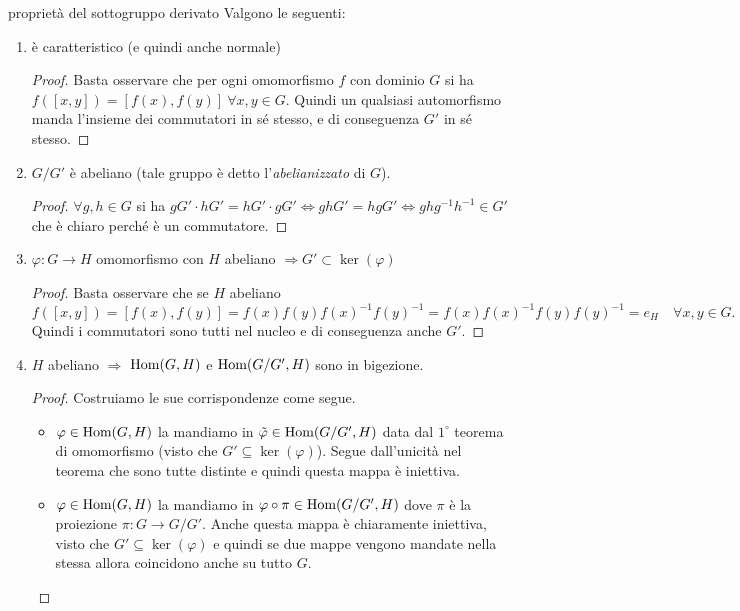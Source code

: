 \begin{proposition}{proprietà del sottogruppo derivato}
    Valgono le seguenti:
    \begin{enumerate}
        \item è caratteristico (e quindi anche normale)
        \begin{proof}
            Basta osservare che per ogni omomorfismo $f$ con dominio $G$ si ha $f([x,y]) = [f(x),f(y)] \ \forall x,y \in G$. Quindi un qualsiasi automorfismo manda l'insieme dei commutatori in sé stesso, e di conseguenza $G'$ in sé stesso.
        \end{proof}
        
        \item $G/G'$ è abeliano (tale gruppo è detto l'\textit{abelianizzato} di $G$).
        \begin{proof}
            $\forall g,h \in G$ si ha $gG' \cdot hG' =  hG' \cdot gG' \iff gh G' = hgG' \iff ghg^{-1}h^{-1} \in G'$ che è chiaro perché è un commutatore.
        \end{proof}
        
        \item $\varphi: G \rightarrow H$ omomorfismo con $H$ abeliano $\Rightarrow G' \subset \ker(\varphi)$
        \begin{proof}
            Basta osservare che se $H$ abeliano
            \[
                f([x,y]) = [f(x),f(y)] = f(x)f(y)f(x)^{-1}f(y)^{-1} = f(x)f(x)^{-1}f(y)f(y)^{-1} = e_H \quad \forall x,y \in G.
            \]
            Quindi i commutatori sono tutti nel nucleo e di conseguenza anche $G'$.
        \end{proof}
        
        \item $H$ abeliano $\Rightarrow$ $\text{Hom}(G,H)$ e $\text{Hom}(G/G',H)$ sono in bigezione.
        \begin{proof}
            Costruiamo le sue corrispondenze come segue. 
            \begin{itemize}
            \item $\varphi \in \text{Hom}(G,H)$ la mandiamo in $\tilde \varphi \in \text{Hom}(G/G',H)$ data dal $1^{\circ}$ teorema di omomorfismo (visto che $G' \subseteq \ker(\varphi)$). Segue dall'unicità nel teorema che sono tutte distinte e quindi questa mappa è iniettiva.
            \item $\varphi \in \text{Hom}(G,H)$ la mandiamo in $\varphi \circ \pi \in \text{Hom}(G/G',H)$ dove $\pi$ è la proiezione $\pi: G \rightarrow G/G'$. Anche questa mappa è chiaramente iniettiva, visto che $G' \subseteq \ker(\varphi)$ e quindi se due mappe vengono mandate nella stessa allora coincidono anche su tutto $G$.
            \end{itemize}
        \end{proof}
        \end{enumerate}    
\end{proposition}

